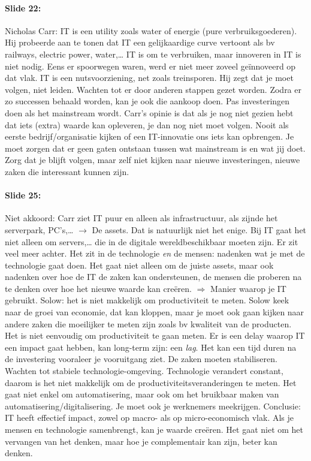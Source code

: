 \documentclass[10pt,a4paper]{report}
\begin{document}
\paragraph{Slide 22:}Nicholas Carr: IT is een utility zoals water of energie (pure verbruiksgoederen). Hij probeerde aan te tonen dat IT een gelijkaardige curve vertoont als bv railways, electric power, water,… IT is om te verbruiken, maar innoveren in IT is niet nodig. Eens er spoorwegen waren, werd er niet meer zoveel geïnnoveerd op dat vlak. IT is een nutsvoorziening, net zoals treinsporen. Hij zegt dat je moet volgen, niet leiden. Wachten tot er door anderen stappen gezet worden. Zodra er zo successen behaald worden, kan je ook die aankoop doen. Pas investeringen doen als het mainstream wordt. Carr's opinie is dat als je nog niet gezien hebt dat iets (extra) waarde kan opleveren, je dan nog niet moet volgen. Nooit als eerste bedrijf/organisatie kijken of een IT-innovatie ons iets kan opbrengen. Je moet zorgen dat er geen gaten ontstaan tussen wat mainstream is en wat jij doet. Zorg dat je blijft volgen, maar zelf niet kijken naar nieuwe investeringen, nieuwe zaken die interessant kunnen zijn. 

\paragraph{Slide 25:}Niet akkoord: Carr ziet IT puur en alleen als infrastructuur, als zijnde het serverpark, PC's,… $\rightarrow$ De assets. Dat is natuurlijk niet het enige. Bij IT gaat het niet alleen om servers,… die in de digitale wereldbeschikbaar moeten zijn. Er zit veel meer achter. Het zit in de technologie \emph{en} de mensen: nadenken wat je met de technologie gaat doen. Het gaat niet alleen om de juiste assets, maar ook nadenken over hoe de IT de zaken kan ondersteunen, de mensen die proberen na te denken over hoe het nieuwe waarde kan creëren. $\Rightarrow$ Manier waarop je IT gebruikt. Solow: het is niet makkelijk om productiviteit te meten. Solow keek naar de groei van economie, dat kan kloppen, maar je moet ook gaan kijken naar andere zaken die moeilijker te meten zijn zoals bv kwaliteit van de producten. Het is niet eenvoudig om productiviteit te gaan meten. Er is een delay waarop IT een impact gaat hebben, kan long-term zijn: een \textit{lag}. Het kan een tijd duren na de investering vooraleer je vooruitgang ziet. De zaken moeten stabiliseren. Wachten tot stabiele technologie-omgeving. Technologie verandert constant, daarom is het niet makkelijk om de productiviteitsveranderingen te meten. Het gaat niet enkel om automatisering, maar ook om het bruikbaar maken van automatisering/digitalisering. Je moet ook je werknemers meekrijgen.  Conclusie: IT heeft effectief impact, zowel op macro- als op micro-economisch vlak. Als je mensen en technologie samenbrengt, kan je waarde creëren. Het gaat niet om het vervangen van het denken, maar hoe je complementair kan zijn, beter kan denken.
\end{document}
